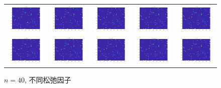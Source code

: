 \documentclass[UTF8,10.5pt,a4paper]{ctexart}
\theoremstyle{definition}
\theoremstyle{definition}
\begin{document}
\begin{figure}[htbp]
	\renewcommand{\captionfont}{\small}
	\centering
	\begin{tabular}{@{}ccccc@{}}
		\includegraphics[width=.18\textwidth]{alpha1n40.jpg} & 
		\includegraphics[width=.18\textwidth]{alpha2n40.jpg} & 
		\includegraphics[width=.18\textwidth]{alpha3n40.jpg} & 
		\includegraphics[width=.18\textwidth]{alpha4n40.jpg} & 
		\includegraphics[width=.18\textwidth]{alpha5n40.jpg}\\
		\includegraphics[width=.18\textwidth]{alpha6n40.jpg} & 
		\includegraphics[width=.18\textwidth]{alpha7n40.jpg} &
		\includegraphics[width=.18\textwidth]{alpha8n40.jpg} & 
		\includegraphics[width=.18\textwidth]{alpha9n40.jpg} & 
		\includegraphics[width=.18\textwidth]{alpha10n40.jpg}
	\end{tabular}
	\caption{$n=40$, 不同松弛因子}
	\label{alphan40figure}
\end{figure}
\end{document}
